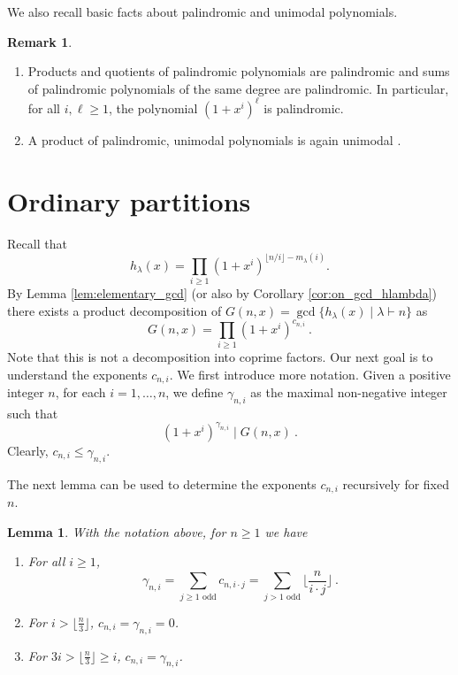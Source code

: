 \documentclass[reqno]{amsart}
\def\gh{\gcd\{h_\lambda(x)\mid\lambda\vdash n\}}
\def\G{G}
\def\e{\gamma}
\newtheorem{lemma}[theorem]{Lemma}
\theoremstyle{definition}
\newtheorem{remark}{Remark}
\begin{document}
We also recall basic facts about palindromic and unimodal polynomials.

\begin{remark}\label{rem:pali-uni} $ $\begin{enumerate}[label=(\alph*)]
\item \label{pal} Products and quotients of palindromic polynomials are palindromic and sums of palindromic polynomials of  the same degree are palindromic.
In particular, for all $i, \ell\geq 1$, the polynomial $(1+x^i)^\ell$ is palindromic. 

\item \label{p_uni} A  product of palindromic,  unimodal polynomials is again  unimodal \cite{A75}. \end{enumerate}
\end{remark}


\section{Ordinary partitions}\label{section:op}



Recall that $$h_\lambda(x)=\prod_{i\geq 1}(1+x^i)^{\lfloor n/i\rfloor-m_\lambda(i)}.$$ 
By Lemma \ref{lem:elementary_gcd} (or also by Corollary \ref{cor:on_gcd_hlambda}) there exists a product decomposition of $\G(n,x)=\gh$ as
\begin{equation}\label{eq:G_decomp}
    \G(n,x)=\prod_{i\geq 1} (1+x^i)^{c_{n,i}}\:.
\end{equation}
Note that this is not a decomposition into coprime factors. Our next goal is to understand the exponents $c_{n,i}$. We first introduce more notation. Given a positive integer $n$,  for each $i=1,\ldots,n$, we define $\e_{n,i}$ as the maximal non-negative integer such that 
\[(1+x^i)^{\e_{n,i}}\mid\G(n,x)\:.\]
Clearly, $c_{n,i}\leq \e_{n,i}$.




The next lemma can be  used to determine the exponents  $c_{n,i}$ recursively for fixed $n$.

\begin{lemma}\label{lem:gcd_hlambda} With  the notation  above, for $n\geq 1$ we have
    \begin{enumerate}[label=(\alph*)]
        \item \label{gammani} For all $i \geq 1$, 
        \[\e_{n,i}=\sum_{j\geq 1 \textrm{ odd}}c_{n,i\cdot j}=\sum_{j>1 \textrm{ odd}}\lfloor\frac{n}{i\cdot j}\rfloor\:.\]
        \item \label{cni}       
        For  $i>\lfloor \frac{n}{3}\rfloor$, $c_ {n,i}=\e_{n,i}=0$.
        \item\label{3i} For $3i>\lfloor \frac{n}{3}\rfloor\geq i$, $c_{n,i}=\e_{n,i}$.        
    \end{enumerate}
\end{lemma}
\end{document}
